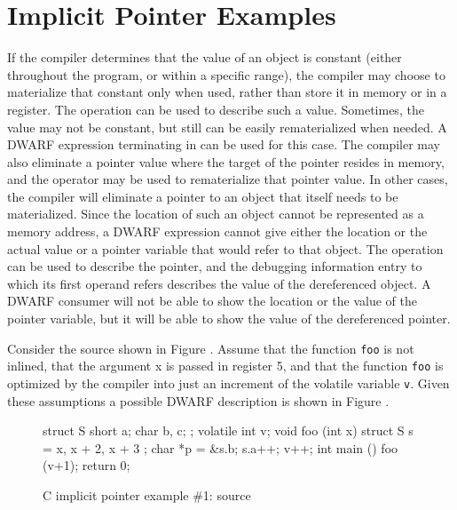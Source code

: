 \section{Implicit Pointer Examples}
\label{app:implicitpointerexamples}
If the compiler determines that the value of an object is
constant (either throughout the program, or within a specific
range), 
\bb
the compiler
\eb
may choose to materialize that constant only when
used, rather than store it in memory or in a register. The
\DWOPimplicitvalue{} operation can be used to describe such a
value. Sometimes, the value may not be constant, but still can be
easily rematerialized when needed. A DWARF expression terminating
in \DWOPstackvalue{} can be used for this case. The compiler may
also eliminate a pointer value where the target of the pointer
resides in memory, and the \DWOPstackvalue{} operator may be used
to rematerialize that pointer value. In other cases, the compiler
will eliminate a pointer to an object that itself needs to be
materialized. Since the location of such an object cannot be
represented as a memory address, a DWARF expression cannot give
either the location or the actual value or a pointer variable
that would refer to that object. The \DWOPimplicitpointer{}
operation can be used to describe the pointer, and the debugging
information entry to which its first operand refers describes the
value of the dereferenced object. A DWARF consumer will not be
able to show the location or the value of the pointer variable,
but it will be able to show the value of the dereferenced
pointer.

Consider the  source shown in 
Figure .
Assume that the function \texttt{foo} is not inlined,
that the argument x is passed in register 5, and that the
function \texttt{foo} is optimized by the compiler into just 
an increment of the volatile variable \texttt{v}. Given these
assumptions a possible DWARF description is shown in
Figure .

\begin{figure}[ht]
\begin{nlnlisting}
struct S { short a; char b, c; };
volatile int v;
void foo (int x)
{
    struct S s = { x, x + 2, x + 3 };
    char *p = &s.b;
    s.a++;
    v++;
}
int main ()
{
    foo (v+1);
    return 0;
}
\end{nlnlisting}
\caption{C implicit pointer example \#1: source}
\label{fig:cimplicitpointerexample1source}
\end{figure}

